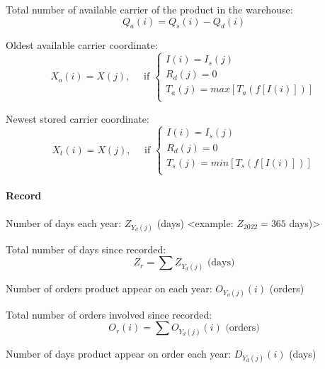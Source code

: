     Total number of available carrier of the product in the warehouse: 
    \begin{equation}\label{eq:Qa}
        Q_a(i) = Q_s(i) - Q_d(i)
    \end{equation}

    Oldest available carrier coordinate:
    \begin{equation}\label{eq:Xo}
        X_o(i) = X(j), \quad \text{ if }
        \begin{cases}
            I(i) = I_s(j) \\
            R_d(j) = 0 \\
            T_a(j) = max[T_a(f[I(i)])] \\
        \end{cases}
    \end{equation}

    Newest stored carrier coordinate:
    \begin{equation}\label{eq:Xt}
        X_t(i) = X(j), \quad \text{ if }
        \begin{cases}
            I(i) = I_s(j) \\
            R_d(j) = 0 \\
            T_s(j) = min[T_s(f[I(i)])] \\
        \end{cases}
    \end{equation}

\paragraph{Record}\mbox{}

    Number of days each year: \quad
    ${ Z_{Y_d(j)} }$ (days) \quad <example: ${Z_{2022} = 365}$ days)>

    Total number of days since recorded: \quad
    \begin{equation}\label{eq:Zr}
        Z_r = \sum Z_{Y_d(j)} \text{ (days)}
    \end{equation}

    Number of orders product appear on each year: \quad
    ${ O_{Y_d(j)}(i) }$ (orders)

    Total number of orders involved since recorded:
    \begin{equation}\label{eq:Or}
        O_r(i) = \sum O_{Y_d(j)}(i) \text{ (orders)}
    \end{equation}

    Number of days product appear on order each year: \quad
    ${ D_{Y_d(j)}(i) }$ (days)

